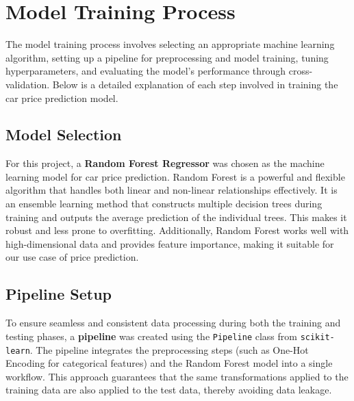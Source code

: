 \documentclass[a4paper,12pt]{article}
\begin{document}
\section{Model Training Process}
\begin{justify}
The model training process involves selecting an appropriate machine learning algorithm, setting up a pipeline for preprocessing and model training, tuning hyperparameters, and evaluating the model's performance through cross-validation. Below is a detailed explanation of each step involved in training the car price prediction model.

\subsection{Model Selection}
For this project, a \textbf{Random Forest Regressor} was chosen as the machine learning model for car price prediction. Random Forest is a powerful and flexible algorithm that handles both linear and non-linear relationships effectively. It is an ensemble learning method that constructs multiple decision trees during training and outputs the average prediction of the individual trees. This makes it robust and less prone to overfitting. Additionally, Random Forest works well with high-dimensional data and provides feature importance, making it suitable for our use case of price prediction.

\subsection{Pipeline Setup}
To ensure seamless and consistent data processing during both the training and testing phases, a \textbf{pipeline} was created using the \texttt{Pipeline} class from \texttt{scikit-learn}. The pipeline integrates the preprocessing steps (such as One-Hot Encoding for categorical features) and the Random Forest model into a single workflow. This approach guarantees that the same transformations applied to the training data are also applied to the test data, thereby avoiding data leakage.


\end{justify}
\end{document}
